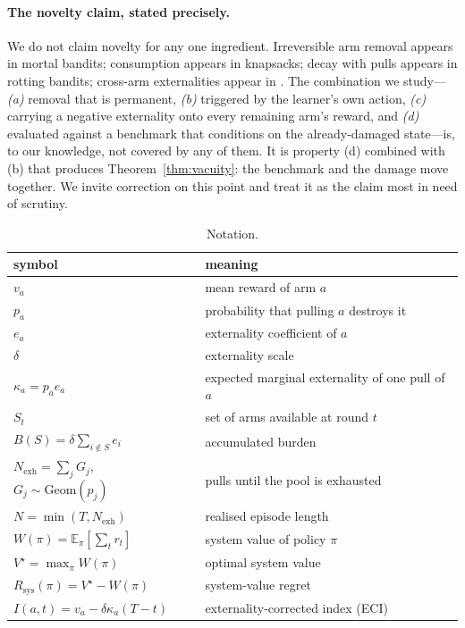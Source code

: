 \paragraph{The novelty claim, stated precisely.} We do not claim novelty for any one
ingredient. Irreversible arm removal appears in mortal bandits; consumption appears
in knapsacks; decay with pulls appears in rotting bandits; cross-arm externalities
appear in \citep{shah2018}. The combination we study---\emph{(a)} removal that is
permanent, \emph{(b)} triggered by the learner's own action, \emph{(c)} carrying a
negative externality onto every remaining arm's reward, and \emph{(d)} evaluated
against a benchmark that conditions on the already-damaged state---is, to our
knowledge, not covered by any of them. It is property (d) combined with (b) that
produces Theorem~\ref{thm:vacuity}: the benchmark and the damage move together. We
invite correction on this point and treat it as the claim most in need of
scrutiny.


\begin{table}[t]
\centering
\caption{Notation.}
\label{tab:notation}
\begin{tabular}{ll}
\toprule
symbol & meaning \\
\midrule
$v_a$ & mean reward of arm $a$ \\
$p_a$ & probability that pulling $a$ destroys it \\
$e_a$ & externality coefficient of $a$ \\
$\delta$ & externality scale \\
$\kappa_a = p_a e_a$ & expected marginal externality of one pull of $a$ \\
$S_t$ & set of arms available at round $t$ \\
$B(S) = \delta\sum_{i \notin S} e_i$ & accumulated burden \\
$N_{\mathrm{exh}} = \sum_j G_j$, $G_j\sim\mathrm{Geom}(p_j)$ & pulls until the pool is exhausted \\
$N = \min(T, N_{\mathrm{exh}})$ & realised episode length \\
$W(\pi) = \mathbb{E}_\pi[\sum_t r_t]$ & system value of policy $\pi$ \\
$V^\star = \max_\pi W(\pi)$ & optimal system value \\
$R_{\mathrm{sys}}(\pi) = V^\star - W(\pi)$ & system-value regret \\
$I(a,t) = v_a - \delta\kappa_a(T-t)$ & externality-corrected index (ECI) \\
\bottomrule
\end{tabular}
\end{table}

